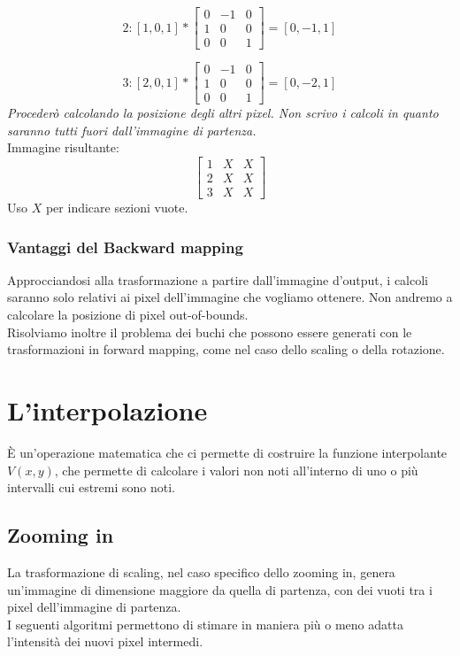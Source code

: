 \documentclass{report}
\begin{document}
$$
2: [1, 0, 1] * \begin{bmatrix}
0 & -1 & 0 \\
1 & 0 & 0 \\
0 & 0 & 1 
\end{bmatrix} = [0, -1, 1]
$$

$$
3: [2, 0, 1] * \begin{bmatrix}
0 & -1 & 0 \\
1 & 0 & 0 \\
0 & 0 & 1 
\end{bmatrix} = [0, -2, 1]
$$
\textit{Procederò calcolando la posizione degli altri pixel. Non scrivo i calcoli in quanto saranno tutti fuori dall'immagine di partenza.}\\
Immagine risultante:
$$
\begin{bmatrix}
	1 & X & X \\
	2 & X & X \\
	3 & X & X 
\end{bmatrix}
$$
Uso $X$ per indicare sezioni vuote.

\subsection{Vantaggi del Backward mapping}
Approcciandosi alla trasformazione a partire dall'immagine d'output, i calcoli saranno solo relativi ai pixel dell'immagine che vogliamo ottenere. Non andremo a calcolare la posizione di pixel out-of-bounds. \\ Risolviamo inoltre il problema dei buchi che possono essere generati con le trasformazioni in forward mapping, come nel caso dello scaling o della rotazione.
    
\newpage
\chapter{L'interpolazione}
È un'operazione matematica che ci permette di costruire la funzione interpolante $V(x,y)$, che permette di calcolare i valori non noti all'interno di uno o più intervalli cui estremi sono noti.

\section{Zooming in}
La trasformazione di scaling, nel caso specifico dello zooming in, genera \\un'immagine di dimensione maggiore da quella di partenza, con dei vuoti tra i pixel dell'immagine di partenza.\\
I seguenti algoritmi permettono di stimare in maniera più o meno adatta\\ l'intensità dei nuovi pixel intermedi.
\end{document}
